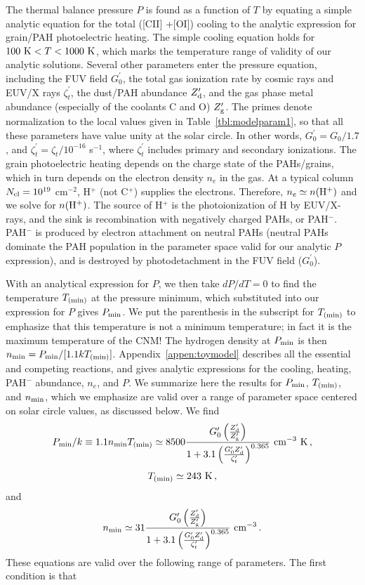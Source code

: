 \documentclass[12pt,preprint,flushrt]{aastex}
\newcommand{\beq}{\begin{equation}}
\newcommand{\eeq}{\end{equation}}
\newcommand{\pmin}{P_{\rm min}}
\newcommand{\tmin}{T_{\rm (min)}}
\newcommand{\nmin}{n_{\rm min}}
\newcommand{\gs}{G_{0}^\prime}
\newcommand{\zd}{Z_{\rm d}^\prime}
\newcommand{\zg}{Z_{\rm g}^\prime}
\newcommand{\zio}{\zeta_{t}^\prime}
\begin{document}
The thermal balance pressure $P$ is found as a function of $T$
by equating a simple analytic equation for the total ([CII]
+[OI]) cooling to the analytic expression for grain/PAH
photoelectric heating. The simple  cooling equation holds for
$100\,\, {\rm K} < T < 1000\,\, {\rm K}$, which marks the temperature
range of validity of our analytic solutions. Several other parameters
enter the pressure equation, including the FUV field $\gs$, the total
gas ionization rate by cosmic rays and EUV/X rays $\zio$, the
dust/PAH abundance $\zd$, and the gas phase metal abundance
(especially of the coolants C and O) $\zg$.  The primes denote 
normalization to the local values given in Table~\ref{tbl:modelparam1},
so that all these parameters have value unity at the solar circle.
In other words, $\gs=G_0/1.7$, and $\zio = \zeta _t /10^{-16}
$ s$^{-1}$, where $\zio$ includes primary and secondary ionizations.
The grain
photoelectric heating depends on the charge state of the PAHs/grains,
which in turn depends on the electron density $n_e$ in the gas.
At a typical column $N_{\rm cl}=10^{19}$ cm$^{-2}$, H$^+$ (not C$^+$)
supplies the electrons. Therefore, $n_e \simeq n({\rm H^+})$ and we solve
for $n({\rm H^+})$. The source of H$^+$ is the photoionization of H
by EUV/X-rays, and the sink is recombination with negatively charged
PAHs, or PAH$^-$.  PAH$^-$ is produced by electron attachment on
neutral PAHs (neutral PAHs dominate the PAH population in the
parameter space valid for our analytic $P$ expression), and is
destroyed by photodetachment in the FUV field ($\gs$).

With an analytical expression for $P$, we then take 
$d P/ d T =0$
to find the temperature $\tmin$ at the pressure minimum, which 
substituted into our expression for $P$
gives $\pmin$.  We put the parenthesis in the subscript for $\tmin$ 
to emphasize that this temperature is not a minimum temperature;
in fact it is the maximum temperature of the CNM!
The hydrogen density at $\pmin$ is then 
$\nmin =\pmin/[1.1k\tmin]$.  Appendix~\ref{appen:toymodel} describes 
all the essential
and competing reactions, and gives analytic expressions for the cooling,
 heating, PAH$^-$ abundance, $n_e$, and $P$. We summarize here
the results for $\pmin$, $\tmin$, and $\nmin$, which we emphasize
are valid over a range of parameter space centered on solar circle values,
as discussed below. 
We find
\beq
\pmin/k \equiv 1.1\nmin \tmin \simeq 8500 {{\gs \left({\zd \over \zg} \right)}
\over {1+3.1\left({{\gs \zd} \over {\zio}}\right)^{0.365}}} \ {\rm cm^{-3}\ K}
   \, ,
\label{eq:pmin}
\eeq
\beq
\tmin \simeq 243\ {\rm K}\, ,
\label{eq:tmin}
\eeq
and
\beq
 \nmin \simeq 31 {{\gs \left({\zd \over \zg} \right)}
\over {1+3.1\left({{\gs \zd} \over {\zio}}\right)^{0.365}}} \ {\rm cm^{-3}}
   \, .
\label{eq:nmin}
\eeq
These equations are valid over the following range of parameters.  The
first condition is that
\end{document}
